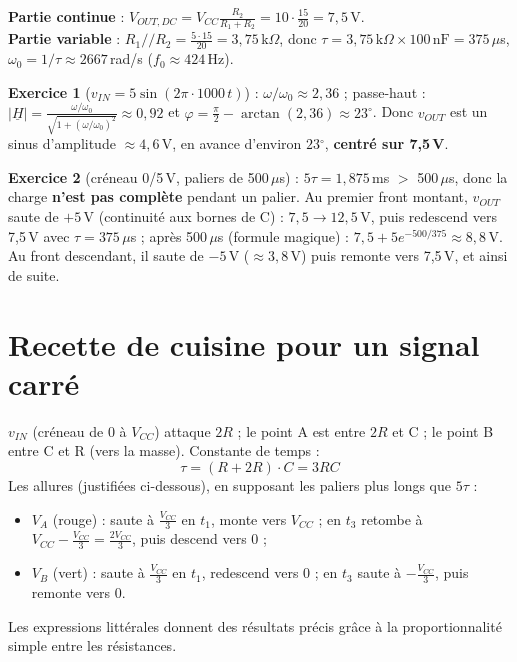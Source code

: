 \begin{exbox}[title={Solution proposée (calculs ajoutés avec les méthodes du cours, pas dans les slides)}]
\textbf{Partie continue} : $V_{OUT,DC} = V_{CC}\frac{R_2}{R_1 + R_2} = 10\cdot\frac{15}{20} = 7{,}5$\,V. \\
\textbf{Partie variable} : $R_1/\!/R_2 = \frac{5\cdot15}{20} = 3{,}75$\,k$\Omega$, donc
$\tau = 3{,}75\,\text{k}\Omega\times100\,\text{nF} = 375\,\mu$s,
$\omega_0 = 1/\tau\approx2667$\,rad/s ($f_0\approx424$\,Hz).

\textbf{Exercice 1} ($v_{IN} = 5\sin(2\pi\cdot1000\,t)$) : $\omega/\omega_0\approx2{,}36$ ;
passe-haut : $|\underline H| = \frac{\omega/\omega_0}{\sqrt{1 + (\omega/\omega_0)^2}}\approx0{,}92$
et $\varphi = \frac\pi2 - \arctan(2{,}36)\approx23\ensuremath{^\circ}$. Donc $v_{OUT}$ est un sinus
d'amplitude $\approx4{,}6$\,V, en avance d'environ $23\ensuremath{^\circ}$, \textbf{centré sur 7,5\,V}.

\textbf{Exercice 2} (créneau 0/5\,V, paliers de 500\,$\mu$s) : $5\tau = 1{,}875$\,ms $>$
500\,$\mu$s, donc la charge \textbf{n'est pas complète} pendant un palier. Au premier front
montant, $v_{OUT}$ saute de $+5$\,V (continuité aux bornes de C) : $7{,}5\to12{,}5$\,V, puis
redescend vers 7,5\,V avec $\tau = 375\,\mu$s ; après 500\,$\mu$s (formule magique) :
$7{,}5 + 5e^{-500/375}\approx8{,}8$\,V. Au front descendant, il saute de $-5$\,V
($\approx3{,}8$\,V) puis remonte vers 7,5\,V, et ainsi de suite.
\end{exbox}

\section{Recette de cuisine pour un signal carré}


\begin{exbox}[title={Le montage et ses allures}]
$v_{IN}$ (créneau de 0 à $V_{CC}$) attaque $2R$ ; le point A est entre $2R$ et C ; le point B
entre C et R (vers la masse). Constante de temps :
\[ \tau = (R + 2R)\cdot C = 3RC \]
Les allures (justifiées ci-dessous), en supposant les paliers plus longs que $5\tau$ :
\begin{itemize}
  \item $V_A$ (rouge) : saute à $\frac{V_{CC}}3$ en $t_1$, monte vers $V_{CC}$ ; en $t_3$
        retombe à $V_{CC} - \frac{V_{CC}}3 = \frac{2V_{CC}}3$, puis descend vers 0 ;
  \item $V_B$ (vert) : saute à $\frac{V_{CC}}3$ en $t_1$, redescend vers 0 ; en $t_3$ saute à
        $-\frac{V_{CC}}3$, puis remonte vers 0.
\end{itemize}
Les expressions littérales donnent des résultats précis grâce à la proportionnalité simple
entre les résistances.
\end{exbox}

